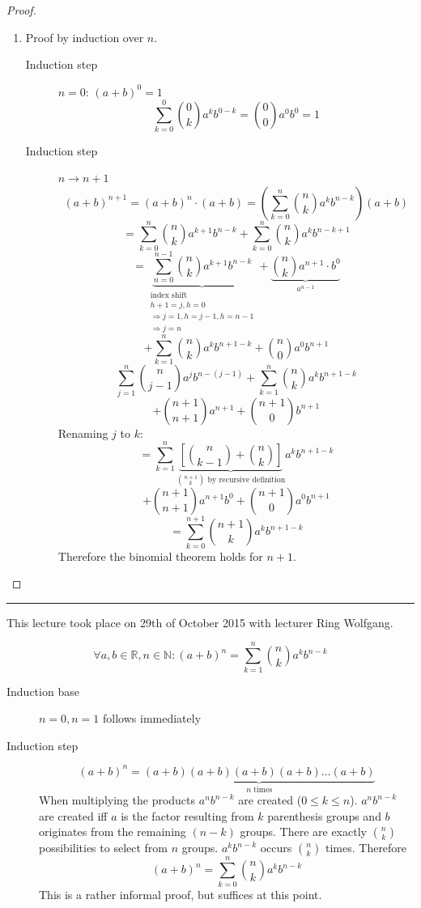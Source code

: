 \documentclass[a4paper,landscape,twocolumn]{article}
\theoremstyle{definition}
\newcommand\meta[3]{\hrule{} This #1 took place on #2 with lecturer #3.\par}
\begin{document}
\begin{proof}
  \begin{enumerate}
    \item
      Proof by induction over $n$.
      \begin{description}
        \item[Induction step] $n=0$: $(a + b)^0 = 1$
          \[ \sum_{k=0}^0 \binom{0}{k} a^k b^{0-k} = \binom{0}{0} a^0 b^0 = 1 \]
        \item[Induction step] $n \rightarrow n + 1$
          \[
            (a + b)^{n+1} = (a + b)^n \cdot (a + b)
            = \left(\sum_{k=0}^n \binom nk a^k b^{n-k}\right) (a + b)
          \] \[
            = \sum_{k=0}^n \binom nk a^{k+1} b^{n-k} + \sum_{k=0}^n \binom nk a^k b^{n-k+1}
          \] \[
            = \underbrace{\sum_{n=0}^{n-1} \binom nk a^{k+1} b^{n-k}}_{\substack{\text{index shift} \\ h + 1 = j, h =0 \\ \Rightarrow j=1, h = j-1, h=n-1 \\ \Rightarrow j = n}} +
              \underbrace{\binom nk a^{n+1} \cdot b^0}_{a^{n-1}}
          \] \[
            + \sum_{k=1}^n \binom nk a^k b^{n+1-k} +
              \binom n0 a^0 b^{n+1}
          \] \[
            \sum_{j=1}^n \binom{n}{j-1} a^j b^{n-(j-1)}
            + \sum_{k=1}^n \binom nk a^k b^{n+1-k}
          \] \[
            + \binom{n+1}{n+1} a^{n+1}
            + \binom{n+1}{0} b^{n+1}
          \]
          Renaming $j$ to $k$:
          \[
            = \sum_{k=1}^n \underbrace{\left[\binom{n}{k-1} + \binom nk\right]}_{\binom{n+1}{k} \text{ by recursive definition}} a^k b^{n+1-k}
          \] \[
            + \binom{n+1}{n+1} a^{n+1} b^0
            + \binom{n+1}{0} a^0 b^{n+1}
          \] \[
            = \sum_{k=0}^{n+1} \binom{n+1}{k} a^k b^{n+1-k}
          \]
          Therefore the binomial theorem holds for $n+1$.
      \end{description}
  \end{enumerate}
\end{proof}

\meta{lecture}{29th of October 2015}{Ring Wolfgang}

\[ \forall a, b \in \mathbb{R}, n \in \mathbb{N}: (a + b)^n = \sum_{k=1}^n \binom{n}{k} a^k b^{n-k}  \]
\begin{description}
  \item[Induction base] $n = 0, n = 1$ follows immediately
  \item[Induction step]
    \[ (a + b)^n = \underbrace{(a + b)(a + b)(a + b)(a + b)\dots(a + b)}_{n \text{ times}} \]
    When multiplying the products $a^n b^{n-k}$ are created ($0 \leq k \leq n$).
    $a^n b^{n-k}$ are created iff $a$ is the factor resulting from $k$ parenthesis groups and
    $b$ originates from the remaining $(n-k)$ groups.
    There are exactly $\binom{n}{k}$ possibilities to select from $n$ groups.
    $a^k b^{n-k}$ occurs $\binom nk$ times.
    Therefore
    \[ (a + b)^n = \sum_{k=0}^n \binom nk a^k b^{n-k} \]
    This is a rather informal proof, but suffices at this point.
\end{description}
\end{document}

